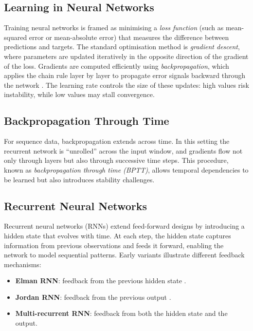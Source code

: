 \documentclass[conference]{IEEEtran}
\begin{document}
\subsection{\textbf{Learning in Neural Networks}}
Training neural networks is framed as minimising a \textit{loss function} (such as mean-squared error or mean-absolute error) that measures the difference between predictions and targets. The standard optimisation method is \textit{gradient descent}, where parameters are updated iteratively in the opposite direction of the gradient of the loss. Gradients are computed efficiently using \textit{backpropagation}, which applies the chain rule layer by layer to propagate error signals backward through the network \cite{rumelhart1986backprop, bishop2006pattern}. The learning rate controls the size of these updates: high values risk instability, while low values may stall convergence.

\subsection{\textbf{Backpropagation Through Time}}
For sequence data, backpropagation extends across time. In this setting the recurrent network is ``unrolled'' across the input window, and gradients flow not only through layers but also through successive time steps. This procedure, known as \textit{backpropagation through time (BPTT)}, allows temporal dependencies to be learned but also introduces stability challenges.

\subsection{\textbf{Recurrent Neural Networks}}
Recurrent neural networks (RNNs) extend feed-forward designs by introducing a hidden state that evolves with time. At each step, the hidden state captures information from previous observations and feeds it forward, enabling the network to model sequential patterns. Early variants illustrate different feedback mechanisms:  
\begin{itemize}
\item \textbf{Elman RNN}: feedback from the previous hidden state \cite{elman1990finding}.  
\item \textbf{Jordan RNN}: feedback from the previous output \cite{jordan1986serial}.  
\item \textbf{Multi-recurrent RNN}: feedback from both the hidden state and the output.  
\end{itemize}
\end{document}
